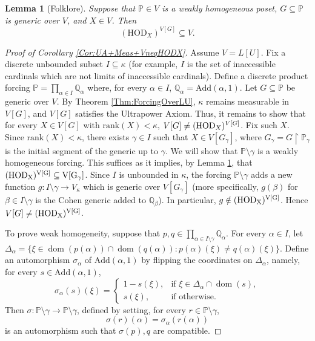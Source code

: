 \documentclass{article}
\theoremstyle{definition}
\theoremstyle{plain}
\newtheorem{lemma}[definition]{Lemma}
\newcommand{\po}{\mathbb{P}}
\newcommand{\qo}{\mathbb{Q}}
\newcommand{\uhr}{\upharpoonright}
\DeclareMathOperator{\dom}{dom}
\begin{document}
\begin{lemma}[Folklore]\label{Lem:HomogeneityAndHOD}
    Suppose that $\po\in V$ is a weakly homogeneous poset, $G\subseteq\po$ is generic over $V$, and $X\in V$. Then
    $$(\mathrm{HOD}_X)^{V[G]}\subseteq V.$$
\end{lemma}


\begin{proof}[Proof of Corollary \ref{Cor:UA+Meas+VneqHODX}]
    Assume $V = L[U]$. Fix a discrete unbounded subset $I \subseteq \kappa$ (for example, $I$ is the set of inaccessible cardinals which are not limits of inaccessible cardinals). Define a discrete product forcing $\po = \prod_{\alpha\in I} \qo_\alpha$ where, for every $\alpha\in I$, $\qo_\alpha = \text{Add}(\alpha,1)$. Let $G\subseteq \po$ be generic over $V$. By Theorem \ref{Thm:ForcingOverLU}, $\kappa$ remains measurable in $V[G]$, and $V[G]$ satisfies the Ultrapower Axiom. 
    Thus, it  remains to show that for every $X\in V[G]$ with $\text{rank}(X)<\kappa$, $V[G]\neq ({\rm{HOD}}_{X})^{V[G]}$. Fix such $X$. Since $\text{rank}(X)<\kappa$, there exists $\gamma\in I$ such that $X\in V[G_{\gamma}]$, where $G_\gamma = G\uhr \po_\gamma$ is the initial segment of the generic up to $\gamma$. We will show that $\po\setminus \gamma$ is a weakly homogeneous forcing. This suffices as it implies, by Lemma \ref{Lem:HomogeneityAndHOD}, that $(\rm{HOD}_X)^{V[G]}\subseteq V[G_\gamma]$. Since $I$ is unbounded in $\kappa$, the forcing $\po\setminus \gamma$ adds a new function $g\colon I\setminus \gamma\to V_\kappa$ which is generic over $V[G_{\gamma}]$ (more specifically, $g(\beta)$ for $\beta\in I\setminus \gamma$ is the Cohen generic added to $\qo_\beta$). In particular, $g
    \notin (\rm{HOD}_X)^{V[G]}$. Hence $V[G]\neq (\rm{HOD}_X)^{V[G]}$.

    To prove weak homogeneity, suppose that $p,q\in \prod_{\alpha\in I\setminus \gamma}\qo_\alpha$.  For every $\alpha\in I$, let $\Delta_{\alpha} = \{ \xi\in \dom(p(\alpha))\cap \dom(q(\alpha)) \colon p(\alpha)(\xi)\neq q(\alpha)(\xi)\}$. Define an automorphism $\sigma_\alpha$ of $\text{Add}(\alpha,1)$ by flipping the coordinates on $\Delta_{\alpha}$, namely, for every $s\in \text{Add}(\alpha,1)$,
    $$ \sigma_\alpha(s)(\xi) =  
    \begin{cases}
        1-s(\xi), & \text{if } \xi\in\Delta_\alpha\cap \dom(s),\\
        s(\xi), & \text{if } \text{otherwise.}
        \end{cases}$$
    Then $\sigma\colon \po\setminus \gamma \to \po\setminus \gamma$, defined by setting, for every $r\in \po\setminus \gamma$,
    $$ \sigma(r)(\alpha) = \sigma_\alpha(r(\alpha)) $$
    is an automorphism such that $\sigma(p), q$ are compatible. \end{proof}
\end{document}
